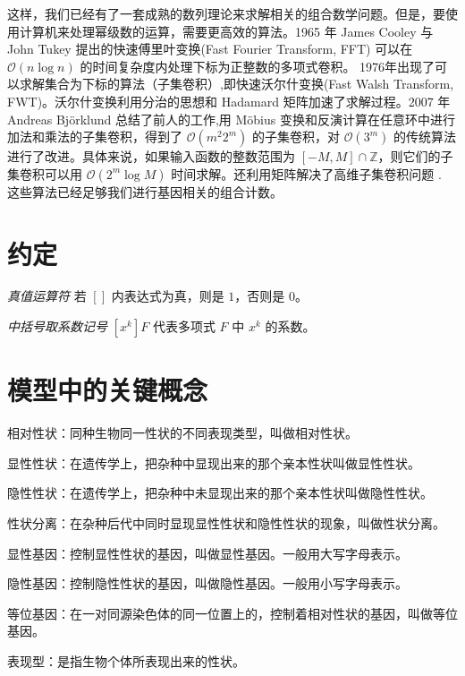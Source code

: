 \documentclass[12pt]{article} %
\begin{document}
这样，我们已经有了一套成熟的数列理论来求解相关的组合数学问题。但是，要使用计算机来处理幂级数的运算，需要更高效的算法。1965 年 James Cooley 与 John Tukey 提出的快速傅里叶变换(Fast Fourier Transform, FFT)\cite{cooley1965algorithm} 可以在 $\mathcal{O}(n\log n)$ 的时间复杂度内处理下标为正整数的多项式卷积。
1976年出现了可以求解集合为下标的算法（子集卷积）,即快速沃尔什变换(Fast Walsh Transform, FWT)\cite{maslen1997generalized}。沃尔什变换利用分治的思想和 Hadamard 矩阵加速了求解过程\cite{coppersmith1987matrix}。2007 年 Andreas Björklund 总结了前人的工作,用 Möbius 变换和反演计算在任意环中进行加法和乘法的子集卷积，得到了 $\mathcal{O}(m^2 2^m)$ 的子集卷积，对 $\mathcal{O}(3^m)$ 的传统算法进行了改进。具体来说，如果输入函数的整数范围为 $[-M,M]\cap \mathbb{Z}$，则它们的子集卷积可以用 $\mathcal{O}(2^m\log M)$ 时间求解。还利用矩阵解决了高维子集卷积问题 \cite{10.1145/1250790.1250801}. 这些算法已经足够我们进行基因相关的组合计数。

\newpage

\section{约定}

\textsl{真值运算符} \qquad 若 $[]$ 内表达式为真，则是 $1$，否则是 $0$。

\textsl{中括号取系数记号} \qquad $[x^k]F$ 代表多项式 $F$ 中 $x^k$ 的系数。

\section{模型中的关键概念}


相对性状\cite{2009陈阅增普通生物学}：同种生物同一性状的不同表现类型，叫做相对性状。

显性性状：在遗传学上，把杂种中显现出来的那个亲本性状叫做显性性状。

隐性性状：在遗传学上，把杂种中未显现出来的那个亲本性状叫做隐性性状。

性状分离：在杂种后代中同时显现显性性状和隐性性状的现象，叫做性状分离。

显性基因：控制显性性状的基因，叫做显性基因。一般用大写字母表示。

隐性基因：控制隐性性状的基因，叫做隐性基因。一般用小写字母表示。

等位基因：在一对同源染色体的同一位置上的，控制着相对性状的基因，叫做等位基因。

表现型：是指生物个体所表现出来的性状。
\end{document}
